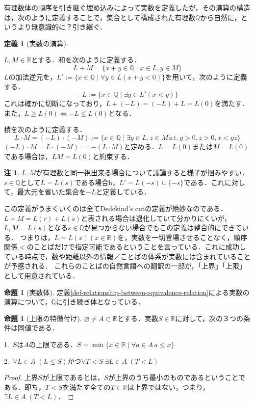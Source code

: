 \documentclass[uplatex, 12pt, dvipdfmx]{jsreport}
\theoremstyle{definition}
\newtheorem{proposition}[theorem]{命題}
\newtheorem{definition}[theorem]{定義}
\newtheorem{remark}[theorem]{注}
\theoremstyle{StatementsWithStar}
\theoremstyle{StatementsWithStar2}
\theoremstyle{StatementsWithStar3}
\theoremstyle{StatementsWithCCirc}
\theoremstyle{definition}
\begin{document}
有理数体の順序を引き継ぐ埋め込みによって実数を定義したが，その演算の構造は，次のように定義することで，集合として構成された有理数$\mathbb{Q}$から自然に，というより無意識的に？引き継ぐ．
\begin{definition}[実数の演算]\label{def-algebraic-structure-of-real-numbers}
    
    $L,M\in\mathbb{R}$とする．和を次のように定義する．
    \[ L+M = \{ x+y\in\mathbb{Q}\mid x\in L, y\in M \} \]
    $L$の加法逆元を，$L':=\{x\in\mathbb{Q}\mid \forall y\in L (x+y<0)\}$を用いて，次のように定義する．
    \[ -L :=\{x\in\mathbb{Q}\mid \exists y\in L'(x<y)\} \]
    これは確かに切断になっており，$L+(-L)=(-L)+L=L(0)$を満たす．また，$L\ge L(0)\Leftrightarrow -L\le L(0)$となる．

    積を次のように定義する．
    \[ L\cdot M=(-L)\cdot (-M) := \{ x\in\mathbb{Q}\mid \exists y\in L, z\in M \,\mathrm{s.t.}\, y>0, z>0, x<yz \} \]
    $(-L)\cdot M=L\cdot (-M)=:-(L\cdot M)$と定める．$L=L(0)$または$M=L(0)$である場合は，$LM=L(0)$と約束する．
\end{definition}
\begin{remark}\rm{}
    $L,M$が有理数と同一視出来る場合について議論すると様子が掴みやすい．$s\in\mathbb{Q}$として$L=L(s)$である場合h，$L'=L(-s)\cup\{-s\}$である．これに対して，最大元を省いた集合を$-L$と定義している．

    この定義がうまくいくのは全てDedekind's cutの定義が絶妙なのである．$L+M=L(r)+L(s)$と表される場合は退化していて分かりにくいが，$L,M=L(s)$となる$s\in\mathbb{Q}$が見つからない場合でもこの定義は整合的にできている．
    つまりは，$L=L(x)(x\in\mathbb{R})$を，実数を一切登場させることなく，順序関係$<$のことばだけで指定可能であるということを言っている．これに成功している時点で，数や距離以外の情報／ことばの体系が実数には含まれていることが予感される．
    これらのことばの自然言語への翻訳の一部が，「上界」「上限」として用意されている．
\end{remark}
\begin{proposition}[実数体]
    定義\ref{def-relationship-between-equivalence-relation}による実数の演算について，$\mathbb{Q}$に引き続き体となっている．
\end{proposition}

\begin{proposition}[上限の特徴付け]
    $\varnothing\ne A\subset\mathbb{R}$とする．実数$S\in\mathbb{R}$に対して，次の３つの条件は同値である．\rm{}

    1.\, $S$は$A$の上限である．$S=\min\{ x\in\mathbb{R}\mid \forall a\in A\,a\le x \}$

    2.\, $\forall L\in A \;(L\le S)$かつ$\forall T<S \; \exists L\in A\; (T<L)$
\end{proposition}
\begin{proof}
    上界$S$が上限であるとは，$S$が上界のうち最小のものであるということである．即ち，$T<S$を満たす全ての$T\in\mathbb{R}$は上界ではない，つまり，$\exists L\in A\; (T<L)$．
\end{proof}
\end{document}
